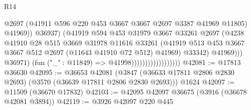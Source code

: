 \begin{lexlean}{R14}
\begin{coremodule}
                                                  @2697
                                                  (@41911
                                                    @596
                                                    @220
                                                    @453
                                                    @3667
                                                    @3667
                                                    @2697
                                                    @3387
                                                    @41969
                                                    @11805)
                                                  @41969))
                                              @36937)
                                            (@41919
                                              @594
                                              @453
                                              @31979
                                              @3667
                                              @33261
                                              @2697
                                              (@4238
                                                @41910
                                                @28
                                                @515
                                                @3669
                                                @31978
                                                @11616
                                                @33261
                                                (@41919
                                                  @513
                                                  @453
                                                  @3667
                                                  @3667
                                                  @512
                                                  @2697
                                                  (@11643 @41910 @72 @512)
                                                  @41969)
                                                @33342)
                                              @41969)))
                                        @36971)
                                      (fun ("_" : @11849) => @41998))))))))))))))))))
@42081 := @17813 @36630
@42095 := @36653
    @42081
    (@3847 (@36633 @17811 @2806 @2830 @2693) (@3570 (@36639 @17811 @2806 @2830 @2693)))
    @1624
@42097 := @11509 (@36670 @17832)
@42103 := @42095 @42097 @36675 (@3916 (@36678 @42081 @3894))
@42119 := @3926
    @42097
    @220
    @445

\end{coremodule}
\end{lexlean}
